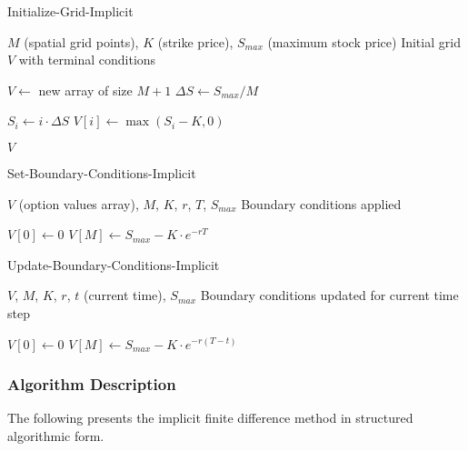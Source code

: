 \documentclass[12pt,a4paper]{article}
\numberwithin{algorithm}{subsection}
\begin{document}
\begin{algorithm}[H]
\caption{Initialize-Grid-Implicit}
\begin{algorithmic}[1]
\REQUIRE $M$ (spatial grid points), $K$ (strike price), $S_{max}$ (maximum stock price)
\ENSURE Initial grid $V$ with terminal conditions

\STATE $V \leftarrow$ new array of size $M+1$
\STATE $\Delta S \leftarrow S_{max} / M$

    \STATE $S_i \leftarrow i \cdot \Delta S$
    \STATE $V[i] \leftarrow \max(S_i - K, 0)$ 
\ENDFOR

\RETURN $V$
\end{algorithmic}
\end{algorithm}

\begin{algorithm}[H]
\caption{Set-Boundary-Conditions-Implicit}
\begin{algorithmic}[1]
\REQUIRE $V$ (option values array), $M$, $K$, $r$, $T$, $S_{max}$
\ENSURE Boundary conditions applied

\STATE $V[0] \leftarrow 0$ 
\STATE $V[M] \leftarrow S_{max} - K \cdot e^{-rT}$ 
\end{algorithmic}
\end{algorithm}

\begin{algorithm}[H]
\caption{Update-Boundary-Conditions-Implicit}
\begin{algorithmic}[1]
\REQUIRE $V$, $M$, $K$, $r$, $t$ (current time), $S_{max}$
\ENSURE Boundary conditions updated for current time step

\STATE $V[0] \leftarrow 0$ 
\STATE $V[M] \leftarrow S_{max} - K \cdot e^{-r(T-t)}$ 
\end{algorithmic}
\end{algorithm}

\subsubsection{Algorithm Description}

The following presents the implicit finite difference method in structured algorithmic form.
\end{document}
